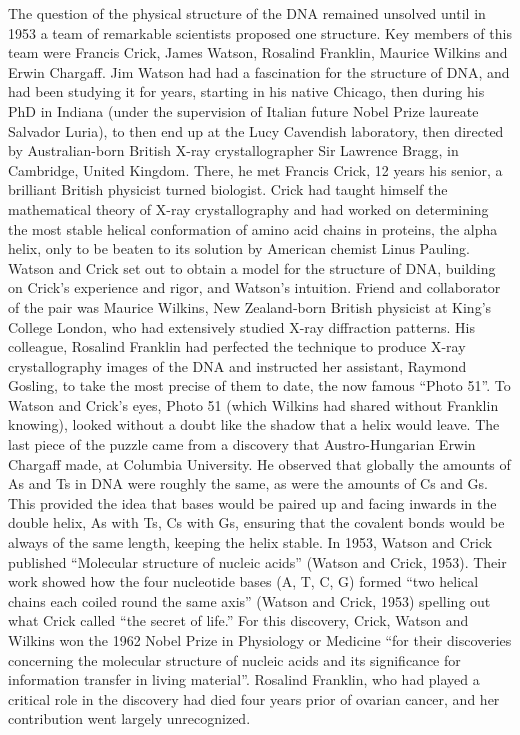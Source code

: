 The question of the physical structure of the DNA remained unsolved until in 1953 a team of remarkable scientists proposed one structure. 
Key members of this team were Francis Crick, James Watson, Rosalind Franklin, Maurice Wilkins and Erwin Chargaff. 
Jim Watson had had a fascination for the structure of DNA, and had been studying it for years, starting in his native Chicago, then during his PhD in Indiana (under the supervision of Italian future Nobel Prize laureate Salvador Luria), to then end up at the Lucy Cavendish laboratory, then directed by Australian-born British X-ray crystallographer Sir Lawrence Bragg, in Cambridge, United Kingdom. 
There, he met Francis Crick, 12 years his senior, a brilliant British physicist turned biologist. 
Crick had taught himself the mathematical theory of X-ray crystallography and had worked on determining the most stable helical conformation of amino acid chains in proteins, the alpha helix, only to be beaten to its solution by American chemist Linus Pauling. 
Watson and Crick set out to obtain a model for the structure of DNA, building on Crick’s experience and rigor, and Watson’s intuition. 
Friend and collaborator of the pair was Maurice Wilkins, New Zealand-born British physicist at King’s College London, who had extensively studied X-ray diffraction patterns. 
His colleague, Rosalind Franklin had perfected the technique to produce X-ray crystallography images of the DNA and instructed her assistant, Raymond Gosling, to take the most precise of them to date, the now famous “Photo 51”. 
To Watson and Crick’s eyes, Photo 51 (which Wilkins had shared without Franklin knowing), looked without a doubt like the shadow that a helix would leave. The last piece of the puzzle came from a discovery that Austro-Hungarian Erwin Chargaff made, at Columbia University. He observed that globally the amounts of As and Ts in DNA were roughly the same, as were the amounts of Cs and Gs. 
This provided the idea that bases would be paired up and facing inwards in the double helix, As with Ts, Cs with Gs, ensuring that the covalent bonds would be always of the same length, keeping the helix stable. 
In 1953, Watson and Crick published “Molecular structure of nucleic acids” (Watson and Crick, 1953). 
Their work showed how the four nucleotide bases (A, T, C, G) formed “two helical chains each coiled round the same axis” (Watson and Crick, 1953) spelling out what Crick called “the secret of life.” 
For this discovery, Crick, Watson and Wilkins won the 1962 Nobel Prize in Physiology or Medicine “for their discoveries concerning the molecular structure of nucleic acids and its significance for information transfer in living material”. 
Rosalind Franklin, who had played a critical role in the discovery had died four years prior of ovarian cancer, and her contribution went largely unrecognized.


